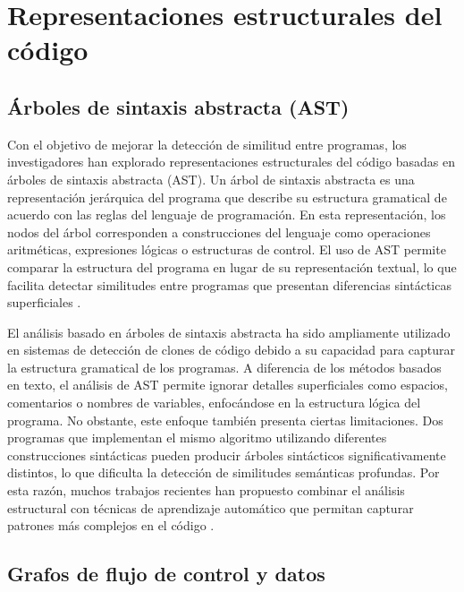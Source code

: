 \section{Representaciones estructurales del código}

\subsection{Árboles de sintaxis abstracta (AST)}

Con el objetivo de mejorar la detección de similitud entre programas, los investigadores han explorado representaciones estructurales del código basadas en árboles de sintaxis abstracta (AST). Un árbol de sintaxis abstracta es una representación jerárquica del programa que describe su estructura gramatical de acuerdo con las reglas del lenguaje de programación. En esta representación, los nodos del árbol corresponden a construcciones del lenguaje como operaciones aritméticas, expresiones lógicas o estructuras de control. El uso de AST permite comparar la estructura del programa en lugar de su representación textual, lo que facilita detectar similitudes entre programas que presentan diferencias sintácticas superficiales \cite{Song2024AST}.

El análisis basado en árboles de sintaxis abstracta ha sido ampliamente utilizado en sistemas de detección de clones de código debido a su capacidad para capturar la estructura gramatical de los programas. A diferencia de los métodos basados en texto, el análisis de AST permite ignorar detalles superficiales como espacios, comentarios o nombres de variables, enfocándose en la estructura lógica del programa. No obstante, este enfoque también presenta ciertas limitaciones. Dos programas que implementan el mismo algoritmo utilizando diferentes construcciones sintácticas pueden producir árboles sintácticos significativamente distintos, lo que dificulta la detección de similitudes semánticas profundas. Por esta razón, muchos trabajos recientes han propuesto combinar el análisis estructural con técnicas de aprendizaje automático que permitan capturar patrones más complejos en el código \cite{Song2024AST}.

\subsection{Grafos de flujo de control y datos}

